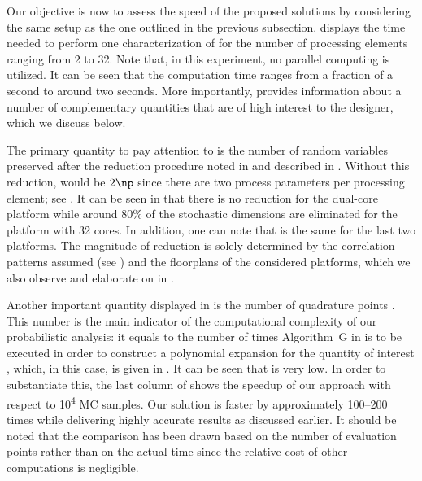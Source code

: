 
Our objective is now to assess the speed of the proposed solutions by
considering the same setup as the one outlined in the previous subsection.
 displays the time needed to perform one
characterization of \vg for the number of processing elements \np ranging from 2
to 32. Note that, in this experiment, no parallel computing is utilized. It can
be seen that the computation time ranges from a fraction of a second to around
two seconds. More importantly,  provides
information about a number of complementary quantities that are of high interest
to the designer, which we discuss below.

The primary quantity to pay attention to is the number of random variables \nz
preserved after the reduction procedure noted in  and
described in . Without this reduction, \nz
would be $2 \np$ since there are two process parameters per processing element;
see . It can be seen in
 that there is no reduction for the dual-core
platform while around 80\% of the stochastic dimensions are eliminated for the
platform with 32 cores. In addition, one can note that \nz is the same for the
last two platforms. The magnitude of reduction is solely determined by the
correlation patterns assumed (see ) and the
floorplans of the considered platforms, which we also observe and elaborate on
in .

Another important quantity displayed in  is the
number of quadrature points \nq. This number is the main indicator of the
computational complexity of our probabilistic analysis: it equals to the number
of times Algorithm~G in  is to be executed in order to
construct a polynomial expansion for the quantity of interest \g, which, in this
case, is given in . It can be seen that \nq is
very low. In order to substantiate this, the last column of
 shows the speedup of our approach with respect
to 10\textsuperscript{4} \ac{MC} samples. Our solution is faster by
approximately 100--200 times while delivering highly accurate results as
discussed earlier. It should be noted that the comparison has been drawn based
on the number of evaluation points rather than on the actual time since the
relative cost of other computations is negligible.

